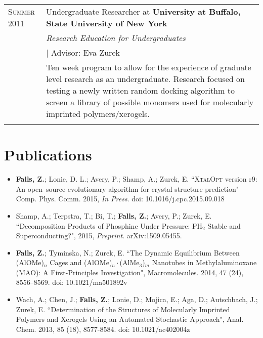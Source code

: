 \documentclass[letterpaper,10pt]{article} %
\begin{document}
\begin{tabular}{R{3cm}|p{13cm}}

\textsc{Summer 2011} & Undergraduate Researcher at \textbf{University at Buffalo, State University of New York} \\
& \emph{Research Education for Undergraduates} \\
& \hspace{3mm} \small | Advisor: Eva Zurek \\ 
& \footnotesize{Ten week program to allow for the experience of graduate level research as an undergraduate. Research focused on testing a newly written random docking algorithm to screen a library of possible monomers used for molecularly imprinted polymers/xerogels.}\\
 \\

\end{tabular}




\section{Publications}
\noindent

\begin{itemize}

    \item \textbf{Falls, Z.}; Lonie, D. L.; Avery, P.; Shamp, A.; Zurek, E. ``\textsc{XtalOpt} version r9: An open–source evolutionary algorithm for crystal structure prediction" Comp. Phys. Comm. 2015, \emph{In Press}. doi: 10.1016/j.cpc.2015.09.018

    \item Shamp, A.; Terpstra, T.; Bi, T.; \textbf{Falls, Z.}; Avery, P.; Zurek, E. ``Decomposition Products of Phosphine Under Pressure: PH$_{2}$ Stable and Superconducting?", 2015, \emph{Preprint}. arXiv:1509.05455.
        
    \item \textbf{Falls, Z.}; Tyminska, N.; Zurek, E. ``The Dynamic Equilibrium Between (AlOMe)$_{n}$ Cages and (AlOMe)$_{n}\cdot$(AlMe$_{3}$)$_{m}$ Nanotubes in Methylaluminoxane (MAO): A First-Principles Investigation", Macromolecules. 2014, 47 (24), 8556–8569. doi: 10.1021/ma501892v

    \item Wach, A.; Chen, J.; \textbf{Falls, Z.}; Lonie, D.; Mojica, E.; Aga, D.; Autschbach, J.; Zurek, E. ``Determination of the Structures of Molecularly Imprinted Polymers and Xerogels Using an Automated Stochastic Approach", Anal. Chem. 2013, 85 (18), 8577-8584. doi: 10.1021/ac402004z

\end{itemize}
\end{document}
